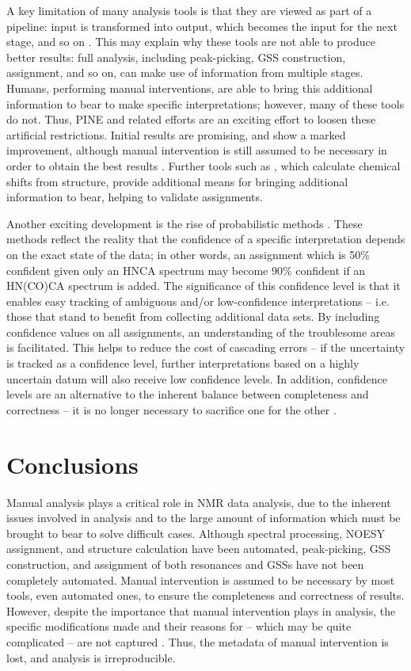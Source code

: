 A key limitation of many analysis tools is that they are viewed as part of a 
pipeline: input is transformed into output, which becomes the input for the 
next stage, and so on \cite{pine}.  This may explain why these tools 
are not able to produce better results:  full analysis, including peak-picking, 
GSS construction, assignment, and so on, can make use of information from 
multiple stages.  Humans, performing manual interventions, are able to bring 
this additional information to bear to make specific interpretations; however, 
many of these tools do not.  Thus, PINE and related efforts  
are an exciting effort to loosen these artificial restrictions.  Initial 
results are promising, and show a marked improvement, although manual 
intervention is still assumed to be necessary in order to obtain the best 
results \cite{pine}.  Further tools such as \cite{shiftx2, cheshire}, 
which calculate chemical shifts from structure, provide additional means 
for bringing additional information to bear, helping to validate assignments.

Another exciting development is the rise of probabilistic methods 
\cite{saga, pine}.  These methods reflect the reality that the 
confidence of a specific interpretation depends on the exact state of the 
data; in other words, an assignment which is 50\% confident given only an 
HNCA spectrum may become 90\% confident if an HN(CO)CA spectrum is added.  
The significance of this confidence level is that it enables easy tracking 
of ambiguous and/or low-confidence interpretations -- i.e. those that stand 
to benefit from collecting additional data sets.  By including confidence 
values on all assignments, an understanding of the troublesome areas is 
facilitated.  This helps to reduce the cost of cascading errors -- if the 
uncertainty is tracked as a confidence level, further interpretations based 
on a highly uncertain datum will also receive low confidence levels.  In 
addition, confidence levels are an alternative to the inherent balance 
between completeness and correctness -- it is no longer necessary to 
sacrifice one for the other \cite{autoassign2001, pine}.


\section{Conclusions}

Manual analysis plays a critical role in NMR data analysis, due to the inherent 
issues involved in analysis and to the large amount of information which must 
be brought to bear to solve difficult cases.  Although spectral processing, 
NOESY assignment, and structure calculation have been automated, peak-picking, 
GSS construction, and assignment of both resonances and GSSs have not been 
completely automated.  Manual intervention is assumed to be necessary by 
most tools, even automated ones, to ensure the completeness and correctness 
of results.  However, despite the importance that manual intervention plays 
in analysis, the specific modifications made and their reasons for -- 
which may be quite complicated -- are not captured \cite{guntert2009automated}.  
Thus, the metadata of manual intervention is lost, and analysis is 
irreproducible.

